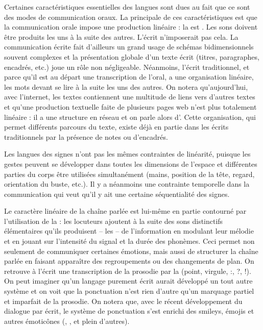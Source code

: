 Certaines caractéristiques essentielles des langues sont dues au fait que ce sont des modes de communication oraux. La principale de ces caractéristiques est que la communication orale impose une production linéaire : la  est . Les sons doivent être produits les uns à la suite des autres. L’écrit n’imposerait pas cela. La communication écrite fait d’ailleurs un grand usage de schémas bidimensionnels souvent complexes et la présentation globale d’un texte écrit (titres, paragraphes, encadrés, etc.) joue un rôle non négligeable. Néanmoins, l’écrit traditionnel, et parce qu’il est au départ une transcription de l’oral, a une organisation linéaire, les mots devant se lire à la suite les uns des autres. On notera qu’aujourd’hui, avec l’internet, les textes contiennent une multitude de liens vers d’autres textes et qu’une production textuelle faite de plusieurs pages web n’est plus totalement linéaire : il a une structure en réseau et on parle alors d’. Cette organisation, qui permet différents parcours du texte, existe déjà en partie dans les écrits traditionnels par la présence de notes ou d’encadrés.

Les langues des signes n’ont pas les mêmes contraintes de linéarité, puisque les gestes peuvent se développer dans toutes les dimensions de l’espace et différentes parties du corps être utilisées simultanément (mains, position de la tête, regard, orientation du buste, etc.). Il y a néanmoins une contrainte temporelle dans la communication qui veut qu’il y ait une certaine séquentialité des signes.

Le caractère linéaire de la chaîne parlée est lui-même en partie contourné par l’utilisation de la : les locuteurs ajoutent à la suite des sons distinctifs élémentaires qu’ils produisent – les  – de l’information en modulant leur mélodie et en jouant sur l’intensité du signal et la durée des phonèmes. Ceci permet non seulement de communiquer certaines émotions, mais aussi de structurer la chaîne parlée en faisant apparaître des regroupements ou des changements de plan. On retrouve à l’écrit une transcription de la prosodie par la  (point, virgule, :, ?, !).  On peut imaginer qu’un langage purement écrit aurait développé un tout autre système et on voit que la ponctuation n’est rien d’autre qu’un marquage partiel et imparfait de la prosodie. On notera que, avec le récent développement du dialogue par écrit, le système de ponctuation s’est enrichi des smileys, émojis et autres émoticônes (\HappySmiley{}, \SadSmiley{}, et plein d’autres).

